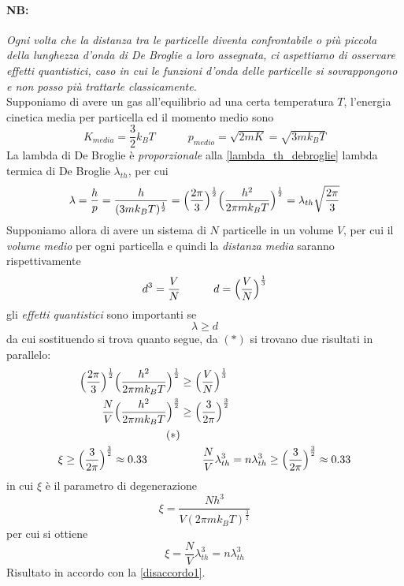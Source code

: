 \paragraph{NB:}
\textit{Ogni volta che la distanza tra le particelle diventa confrontabile o più piccola della lunghezza d'onda di De Broglie a loro assegnata, ci aspettiamo di osservare effetti quantistici, caso in cui le funzioni d'onda delle particelle si sovrappongono e non posso più trattarle classicamente.} \\
Supponiamo di avere un gas all'equilibrio ad una certa temperatura $T$, l'energia cinetica media per particella ed il momento medio sono
\begin{equation}
K_{media} = \frac{3}{2} k_B T
\quad\quad\quad
p_{medio} = \sqrt{2mK} = \sqrt{3 m k_B T}
\end{equation}
La lambda di De Broglie è \textit{proporzionale} alla \ref{lambda_th_debroglie} lambda termica di De Broglie $\lambda_{th}$, per cui
\begin{equation}
\lambda = \frac{h}{p} 
= \frac{h}{(3mk_B T)^{ \frac{1}{2} }}
= \Bigl(  \frac{2\pi}{3}  \Bigr)^{ \frac{1}{2} }\Bigl(  \frac{h^2}{2\pi mk_B T}  \Bigr)^{ \frac{1}{2} }
= \lambda_{th} \sqrt{\frac{2\pi}{3}} 
\end{equation}
Supponiamo allora di avere un sistema di $N$ particelle in un volume $V$, per cui il \textit{volume medio} per ogni particella e quindi la \textit{distanza media} saranno rispettivamente
\begin{equation}
d^3 = \frac{V}{N}
\quad\quad\quad
d = \Bigl(   \frac{V}{N}  \Bigr)^{\frac{1}{3}}
\end{equation}
gli \textit{effetti quantistici} sono importanti se
\begin{equation}
\lambda \ge d
\end{equation}
da cui sostituendo si trova quanto segue, da $(\ast)$ si trovano due risultati in parallelo:
\begin{equation}
\begin{split}
\Bigl(  \frac{2\pi}{3}  \Bigr)^{ \frac{1}{2} } \Bigl(  \frac{h^2}{2\pi mk_B T}  \Bigr)^{ \frac{1}{2} }  & \ge \Bigl(   \frac{V}{N}  \Bigr)^{\frac{1}{3}} \\
\frac{N}{V} \Bigl(  \frac{h^2}{2\pi mk_B T}  \Bigr)^{ \frac{3}{2} } & \ge \Bigl(  \frac{3}{2\pi}  \Bigr)^{ \frac{3}{2} }  \\
(\ast) & \\
\xi \ge  \Bigl(  \frac{3}{2\pi}  \Bigr)^{ \frac{3}{2} } \approx 0.33
\quad\quad\quad & \quad\quad
\frac{N}{V} \lambda_{th}^3 = n\lambda_{th}^3 \ge  \Bigl(  \frac{3}{2\pi}  \Bigr)^{ \frac{3}{2} } \approx 0.33
\end{split}
\end{equation}
in cui $\xi$ è il parametro di degenerazione
\begin{equation}
\xi = \frac{N h^3}{V(2\pi mk_B T)^{ \frac{3}{2} }}
\end{equation}
per cui si ottiene
\begin{equation}
\xi = \frac{N}{V} \lambda_{th}^3 = n \lambda_{th}^3
\end{equation}
Risultato in accordo con la \ref{disaccordo1}.

